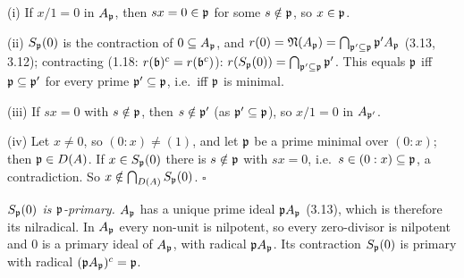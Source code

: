 \documentclass[11pt]{article}
\begin{document}
\pf
(i) If $x/1=0$ in $A_\mathfrak p$, then $sx=0\in\mathfrak p$ for some $s\notin\mathfrak p$, so $x\in\mathfrak p$.

(ii) $S_\mathfrak p(0)$ is the contraction of $0\subseteq A_\mathfrak p$, and $r(0)=\mathfrak N(A_\mathfrak p)=\bigcap_{\mathfrak p'\subseteq\mathfrak p}\mathfrak p'A_\mathfrak p$ (3.13, 3.12); contracting (1.18: $r(\mathfrak b)^c=r(\mathfrak b^c)$): $r(S_\mathfrak p(0))=\bigcap_{\mathfrak p'\subseteq\mathfrak p}\mathfrak p'$. This equals $\mathfrak p$ iff $\mathfrak p\subseteq\mathfrak p'$ for every prime $\mathfrak p'\subseteq\mathfrak p$, i.e.\ iff $\mathfrak p$ is minimal.

(iii) If $sx=0$ with $s\notin\mathfrak p$, then $s\notin\mathfrak p'$ (as $\mathfrak p'\subseteq\mathfrak p$), so $x/1=0$ in $A_{\mathfrak p'}$.

(iv) Let $x\ne0$, so $(0:x)\ne(1)$, and let $\mathfrak p$ be a prime minimal over $(0:x)$; then $\mathfrak p\in D(A)$. If $x\in S_\mathfrak p(0)$ there is $s\notin\mathfrak p$ with $sx=0$, i.e.\ $s\in(0:x)\subseteq\mathfrak p$, a contradiction. So $x\notin\bigcap_{D(A)}S_\mathfrak p(0)$. \hfill$\square$

\pf
\emph{$S_\mathfrak p(0)$ is $\mathfrak p$-primary.} $A_\mathfrak p$ has a unique prime ideal $\mathfrak p A_\mathfrak p$ (3.13), which is therefore its nilradical. In $A_\mathfrak p$ every non-unit is nilpotent, so every zero-divisor is nilpotent and $0$ is a primary ideal of $A_\mathfrak p$, with radical $\mathfrak p A_\mathfrak p$. Its contraction $S_\mathfrak p(0)$ is primary with radical $(\mathfrak p A_\mathfrak p)^c=\mathfrak p$.
\end{document}
